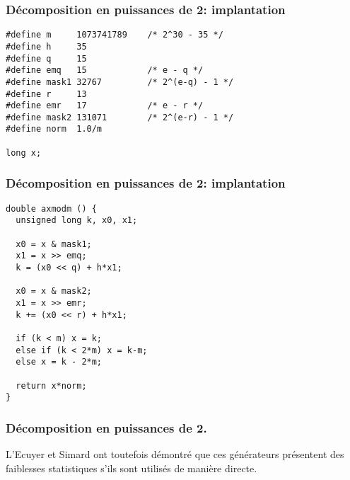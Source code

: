 \documentclass[t,usepdftitle=false]{beamer}
\begin{document}
\begin{frame}[fragile]
\frametitle{Décomposition en puissances de 2: implantation}

\begin{footnotesize}
\begin{verbatim}
#define m     1073741789    /* 2^30 - 35 */
#define h     35
#define q     15
#define emq   15            /* e - q */
#define mask1 32767         /* 2^(e-q) - 1 */
#define r     13
#define emr   17            /* e - r */
#define mask2 131071        /* 2^(e-r) - 1 */
#define norm  1.0/m

long x;
\end{verbatim}
\end{footnotesize}

\end{frame}

\begin{frame}[fragile]
\frametitle{Décomposition en puissances de 2: implantation}

\begin{footnotesize}
\begin{verbatim}
double axmodm () {
  unsigned long k, x0, x1;

  x0 = x & mask1;
  x1 = x >> emq;
  k = (x0 << q) + h*x1;

  x0 = x & mask2;
  x1 = x >> emr;
  k += (x0 << r) + h*x1;

  if (k < m) x = k;
  else if (k < 2*m) x = k-m;
  else x = k - 2*m;

  return x*norm;
}
\end{verbatim}
\end{footnotesize}

\end{frame}

\begin{frame}
\frametitle{Décomposition en puissances de 2.}

L'Ecuyer et Simard ont toutefois démontré que ces générateurs
présentent des faiblesses statistiques s'ils sont utilisés de manière
directe.

\end{frame}
\end{document}
